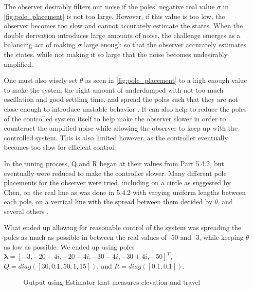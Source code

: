 The observer desirably filters out noise if the poles' negative real value $\sigma$ in \cref{fig:pole_placement} is not too large. However, if this value is too low, the observer becomes too slow and cannot accurately estimate the states. When the double derivation introduces large amounts of noise, the challenge emerges as a balancing act of making $\sigma$ large enough so that the observer accurately estimates the states, while not making it so large that the noise becomes undesirably amplified.

One must also wisely set $\theta$ as seen in \cref{fig:pole_placement} to a high enough value to make the system the right amount of underdamped with not too much oscillation and good settling time, and spread the poles such that they are not close enough to introduce unstable behavior \cite[p.290]{chen14}. It can also help to reduce the poles of the controlled system itself to help make the observer slower in order to counteract the amplified noise while allowing the observer to keep up with the controlled system. This is also limited however, as the controller eventually becomes too slow for efficient control.

In the tuning process, Q and R began at their values from Part 5.4.2, but eventually were reduced to make the controller slower. Many different pole placements for the observer were tried, including on a circle as suggested by Chen, on the real line as was done in 5.4.2 with varying uniform lengths between each pole, on a vertical line with the spread between them decided by $\theta$, and several others \cite[p.290]{chen14}.

What ended up allowing for reasonable control of the system was spreading the poles as much as possible in between the real values of -50 and -3, while keeping $\theta$ as low as possible.  We ended up using poles $\bm{\lambda} = [-3, -20-4i, -20+4i, -30-4i, -30+4i, -50]^T$, $Q = diag([30, 0.1, 50, 1, 15])$, and $R = diag([0.1, 0.1])$.

\begin{figure}[h]
\caption{Output using Estimator that measures elevation and travel}
\label{fig:Estimator4_3}
\end{figure}

